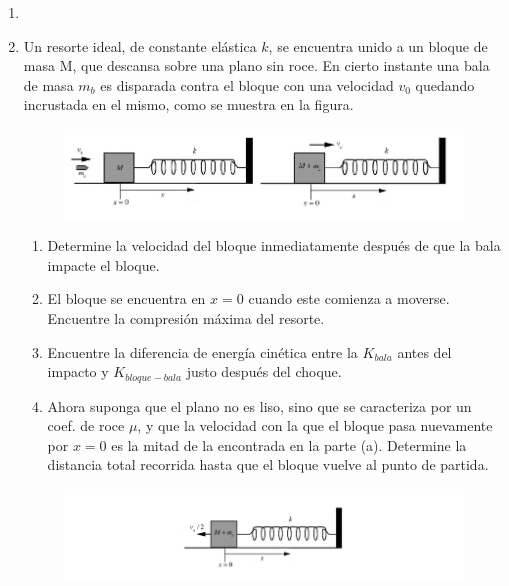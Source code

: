 \documentclass[letterpaper,11pt]{article}
\begin{document}
\vspace{-1cm}
\begin{enumerate}\setlength{\itemsep}{0.4cm}


\item[]

\item Un resorte ideal, de constante elástica $k$, se encuentra unido a un bloque de masa M, que descansa sobre una plano sin roce. En cierto instante una bala de masa $m_b$ es disparada contra el bloque con una velocidad $v_0$ quedando incrustada en el mismo, como se muestra en la figura.
\begin{figure}[h!]
    \centering
    \includegraphics[scale=0.4]{2021-1/Imagenes/aux12/Captura de Pantalla 2021-06-22 a la(s) 21.45.50.png}
\end{figure}
\begin{enumerate}
    \item Determine la velocidad del bloque inmediatamente después de que la bala impacte el bloque.
    \item El bloque se encuentra en $x=0$ cuando este comienza a moverse. Encuentre la compresión máxima del resorte.
    \item Encuentre la diferencia de energía cinética entre la $K_{bala}$ antes del impacto y $K_{bloque-bala}$ justo después del choque. 
    \item Ahora suponga que el plano no es liso, sino que se caracteriza por un coef. de roce $\mu$, y que la velocidad con la que el bloque pasa nuevamente por $x=0$ es la mitad de la encontrada en la parte (a). Determine la distancia total recorrida hasta que el bloque vuelve al punto de partida. 
    \end{enumerate}

\begin{figure}[h!]
    \centering
    \includegraphics[scale=0.4]{2021-1/Imagenes/aux12/Captura de Pantalla 2021-06-22 a la(s) 21.46.04.png}
\end{figure}


\end{enumerate}
\end{document}
